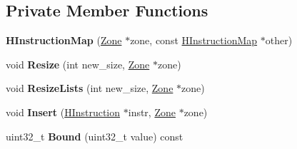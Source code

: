 \subsection*{Private Member Functions}
\begin{DoxyCompactItemize}
\item 
{\bfseries H\+Instruction\+Map} (\hyperlink{classv8_1_1internal_1_1_zone}{Zone} $\ast$zone, const \hyperlink{classv8_1_1internal_1_1_h_instruction_map}{H\+Instruction\+Map} $\ast$other)\hypertarget{classv8_1_1internal_1_1_h_instruction_map_a09964832572c20663f4aa1578ba15e78}{}\label{classv8_1_1internal_1_1_h_instruction_map_a09964832572c20663f4aa1578ba15e78}

\item 
void {\bfseries Resize} (int new\+\_\+size, \hyperlink{classv8_1_1internal_1_1_zone}{Zone} $\ast$zone)\hypertarget{classv8_1_1internal_1_1_h_instruction_map_a3e8c3ff9efaec6f732e9826795e06b68}{}\label{classv8_1_1internal_1_1_h_instruction_map_a3e8c3ff9efaec6f732e9826795e06b68}

\item 
void {\bfseries Resize\+Lists} (int new\+\_\+size, \hyperlink{classv8_1_1internal_1_1_zone}{Zone} $\ast$zone)\hypertarget{classv8_1_1internal_1_1_h_instruction_map_a441768c8e5f1baed685d2c71e2e8b739}{}\label{classv8_1_1internal_1_1_h_instruction_map_a441768c8e5f1baed685d2c71e2e8b739}

\item 
void {\bfseries Insert} (\hyperlink{classv8_1_1internal_1_1_h_instruction}{H\+Instruction} $\ast$instr, \hyperlink{classv8_1_1internal_1_1_zone}{Zone} $\ast$zone)\hypertarget{classv8_1_1internal_1_1_h_instruction_map_a6340aee45923fd5c4a7bc9e4e71264fe}{}\label{classv8_1_1internal_1_1_h_instruction_map_a6340aee45923fd5c4a7bc9e4e71264fe}

\item 
uint32\+\_\+t {\bfseries Bound} (uint32\+\_\+t value) const \hypertarget{classv8_1_1internal_1_1_h_instruction_map_abac9ab9984264d7d53118ea9c9f91833}{}\label{classv8_1_1internal_1_1_h_instruction_map_abac9ab9984264d7d53118ea9c9f91833}

\end{DoxyCompactItemize}
